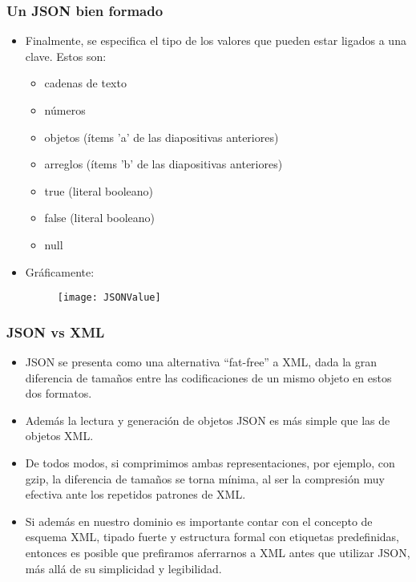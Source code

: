 \begin{frame}
\frametitle{Un JSON bien formado}
\begin{itemize}
\item	Finalmente, se especifica el tipo de los valores que pueden estar ligados a una clave. Estos son:
\begin{itemize}
	\item	cadenas de texto
	\item	números
	\item	objetos (ítems 'a' de las diapositivas anteriores)
	\item	arreglos (ítems 'b' de las diapositivas anteriores)
	\item	true (literal booleano)
	\item	false (literal booleano)
	\item	null
\end{itemize}
\pause
\item Gráficamente: \\
		\begin{figure}
		\texttt{[image: JSONValue]}
		\end{figure}
\end{itemize}
\end{frame}

\begin{frame}
\frametitle{JSON vs XML}
\begin{itemize}
\item	JSON se presenta como una alternativa ``fat-free'' a XML, dada la gran diferencia de tamaños entre las codificaciones de un mismo objeto en estos dos formatos. \\
		\pause
\item	Además la lectura y generación de objetos JSON es más simple que las de objetos XML. \\
		\pause
\item	De todos modos, si comprimimos ambas representaciones, por ejemplo, con gzip, la diferencia de tamaños se torna mínima, al ser la compresión muy efectiva ante los repetidos patrones de XML. \\
		\pause
\item	Si además en nuestro dominio es importante contar con el concepto de esquema XML, tipado fuerte y estructura formal con etiquetas predefinidas, entonces es posible que prefiramos aferrarnos a XML antes que utilizar JSON, más allá de su simplicidad y legibilidad.

\end{itemize}
\end{frame}
